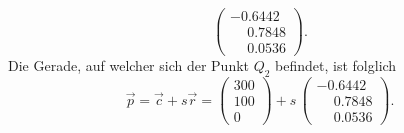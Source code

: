 \begin{loesung}
\begin{teilaufgaben}
\[\begin{pmatrix}
  -0.6442\\
  \phantom{-}0.7848\\
  \phantom{-}0.0536
\end{pmatrix}.
\]
Die Gerade, auf welcher sich der Punkt $Q_2$ befindet, ist folglich
\[
\vec p = \vec c + s\vec r = 
\begin{pmatrix}
300\\
100\\
0
\end{pmatrix} + s\,
\begin{pmatrix}
-0.6442\\
\phantom{-}0.7848\\
\phantom{-}0.0536
\end{pmatrix}.
\]
\qedhere
\end{teilaufgaben}
\end{loesung}
